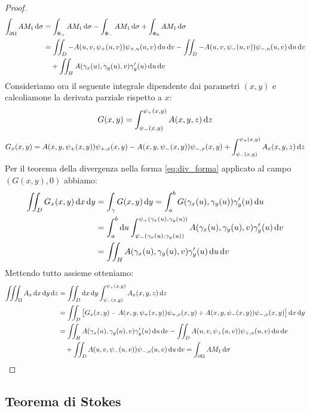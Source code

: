 \begin{proof}
	\begin{align*}
		\int_{\partial\Omega} AM_1 \dif\sigma &= \int_{\Phi_+} AM_1 \dif{\sigma} - \int_{\Phi_-} AM_1 \dif{\sigma} + \int_{\Phi_0} AM_1 \dif{\sigma} \\
		&= \iint_D -A(u,v,\psi_+(u,v)) \psi_{+,u}(u,v) \dif{u}\dif{v} - \iint_D -A(u,v,\psi_-(u,v)) \psi_{-,u}(u,v) \dif{u}\dif{v} \\
		&\quad + \iint_H A(\gamma_x(u),\gamma_y(u),v)\gamma_y'(u) \dif{u}\dif{v}
	\end{align*}
	Consideriamo ora il seguente integrale dipendente dai parametri $ (x,y) $ e calcoliamone la derivata parziale rispetto a $ x $:
	\[ G(x,y) = \int_{\psi_-(x,y)}^{\psi_+(x,y)} A(x,y,z) \dif{z} \]
	\[ G_x(x,y) = A(x,y,\psi_+(x,y))\psi_{+,x}(x,y) - A(x,y,\psi_-(x,y))\psi_{-,x}(x,y) + \int_{\psi_-(x,y)}^{\psi_+(x,y)} A_x(x,y,z) \dif{z} \]
	Per il teorema della divergenza nella forma \eqref{eq:div_forma} applicato al campo $ (G(x,y),0) $ abbiamo:
	\begin{align*}
		\iint_D G_x(x,y) \dif{x}\dif{y} &= \int_{\gamma} G(x,y)\dif{y} = \int_a^b G(\gamma_x(u), \gamma_y(u)) \gamma_y'(u) \dif{u} \\
		&= \int_a^b \dif{u} \int_{\psi_-(\gamma_x(u),\gamma_y(u))}^{\psi_+(\gamma_x(u),\gamma_y(u))} A(\gamma_x(u),\gamma_y(u),v) \gamma_y'(u) \dif{v}\\
		&= \iint_H A(\gamma_x(u),\gamma_y(u),v)\gamma_y'(u) \dif{u}\dif{v}
	\end{align*}
	Mettendo tutto assieme otteniamo:
	\begin{align*}
		\iiint_\Omega A_x \dif{x}\dif{y}\dif{z} &= \iint_D \dif{x}\dif{y} \int_{\psi_-(x,y)}^{\psi_+(x,y)} A_x(x,y,z) \dif{z} \\
		&= \iint_D \left[G_x(x,y) - A(x,y,\psi_+(x,y))\psi_{+,x}(x,y) + A(x,y,\psi_-(x,y))\psi_{-,x}(x,y) \right] \dif{x}\dif{y} \\
		&= \iint_H A(\gamma_x(u),\gamma_y(u),v)\gamma_y'(u) \dif{u}\dif{v} -
		\iint_D A(u,v,\psi_+(u,v)) \psi_{+,u}(u,v) \dif{u}\dif{v} \\
		&\quad+ \iint_D A(u,v,\psi_-(u,v)) \psi_{-,u}(u,v) \dif{u}\dif{v} = \int_{\partial\Omega} AM_1 \dif{\sigma}\qedhere
	\end{align*}
\end{proof}


\subsection{Teorema di Stokes}

